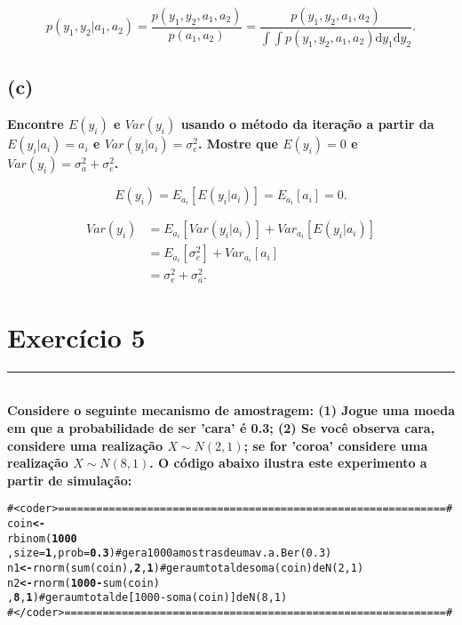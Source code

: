 \documentclass[12pt, oldfontcommands]{article}\usepackage[]{graphicx}\usepackage[]{color}
\makeatletter
\newcommand{\hlnum}[1]{\textcolor[rgb]{0.502,0,0.502}{\textbf{#1}}}%
\newcommand{\hlcom}[1]{\textcolor[rgb]{1,0.502,0}{#1}}%
\newcommand{\hlopt}[1]{\textcolor[rgb]{1,0,0.502}{\textbf{#1}}}%
\newcommand{\hlstd}[1]{\textcolor[rgb]{0,0,0}{#1}}%
\newcommand{\hlkwb}[1]{\textcolor[rgb]{0.502,0.502,0.753}{\textbf{#1}}}%
\newcommand{\hlkwc}[1]{\textcolor[rgb]{0,0.502,0.753}{#1}}%
\newcommand{\hlkwd}[1]{\textcolor[rgb]{0,0.267,0.4}{#1}}%
\newenvironment{kframe}{%
 \def\at@end@of@kframe{}%
 \ifinner\ifhmode%
  \def\at@end@of@kframe{\end{minipage}}%
  \begin{minipage}{\columnwidth}%
 \fi\fi%
 \def\FrameCommand##1{\hskip\@totalleftmargin \hskip-\fboxsep
 \colorbox{shadecolor}{##1}\hskip-\fboxsep
     \hskip-\linewidth \hskip-\@totalleftmargin \hskip\columnwidth}%
 \MakeFramed {\advance\hsize-\width
   \@totalleftmargin\z@ \linewidth\hsize
   \@setminipage}}%
 {\par\unskip\endMakeFramed%
 \at@end@of@kframe}
\newenvironment{knitrout}{}{} %
\newcommand{\horrule}[1]{\rule{\linewidth}{#1}}
\makeatother
\begin{document}
\[ p(y_{1}, y_{2} | a_{1}, a_{2}) =
    \frac{p(y_{1}, y_{2}, a_{1}, a_{2})}{p(a_{1}, a_{2})} =
    \frac{p(y_{1}, y_{2}, a_{1}, a_{2})}{
     \int \int p(y_{1}, y_{2}, a_{1}, a_{2})\text{d} y_{1} \text{d} y_{2}}
   .
\]

\subsection*{(c)} 

\textbf{Encontre \(E(y_{i})\) e \(Var(y_{i})\) usando o método da
        iteração a partir da \(E(y_{i} | a_{i}) = a_{i}\) e
        \(Var(y_{i} | a_{i}) = \sigma_{e}^{2}\). Mostre que
        \(E(y_{i}) = 0\) e
        \(Var(y_{i}) = \sigma_{a}^{2} + \sigma_{e}^{2}\).}

\[ E(y_{i}) = E_{a_{i}}[E(y_{i} | a_{i})] = E_{a_{i}}[a_{i}] = 0. \]

\begin{align*}
 Var(y_{i}) &=
  E_{a_{i}}[Var(y_{i} | a_{i})] + Var_{a_{i}}[E(y_{i} | a_{i})] \\
            &= E_{a_{i}}[\sigma_{e}^{2}] + Var_{a_{i}}[a_{i}] \\
            &= \sigma_{e}^{2} + \sigma_{a}^{2}.
\end{align*}

\section*{Exercício 5} 

\horrule{1pt} \\

\textbf{Considere o seguinte mecanismo de amostragem: (1) Jogue uma moeda
        em que a probabilidade de ser 'cara' é 0.3; (2) Se você observa
        cara, considere uma realização \(X \sim N(2, 1)\); se for 'coroa'
        considere uma realização \(X \sim N(8, 1)\). O código abaixo
        ilustra este experimento a partir de simulação:}

\begin{knitrout}\small
{}\color{fgcolor}\begin{kframe}
\begin{alltt}
\hlcom{# <code r> ============================================================= #}
\hlstd{coin} \hlkwb{<-}
  \hlkwd{rbinom}\hlstd{(}\hlnum{1000}
         \hlstd{,} \hlkwc{size} \hlstd{=} \hlnum{1}\hlstd{,} \hlkwc{prob} \hlstd{=} \hlnum{0.3}\hlstd{)} \hlcom{# gera 1000 amostras de uma v.a. Ber(0.3)}
\hlstd{n1} \hlkwb{<-} \hlkwd{rnorm}\hlstd{(}\hlkwd{sum}\hlstd{(coin),} \hlnum{2}\hlstd{,} \hlnum{1}\hlstd{)} \hlcom{# gera um total de soma(coin) de N(2, 1)}
\hlstd{n2} \hlkwb{<-} \hlkwd{rnorm}\hlstd{(}\hlnum{1000} \hlopt{-} \hlkwd{sum}\hlstd{(coin)}
            \hlstd{,} \hlnum{8}\hlstd{,} \hlnum{1}\hlstd{)} \hlcom{# gera um total de [1000 - soma(coin)] de N(8, 1)}
\hlcom{# </code r> ============================================================ #}
\end{alltt}
\end{kframe}
\end{knitrout}
\end{document}
